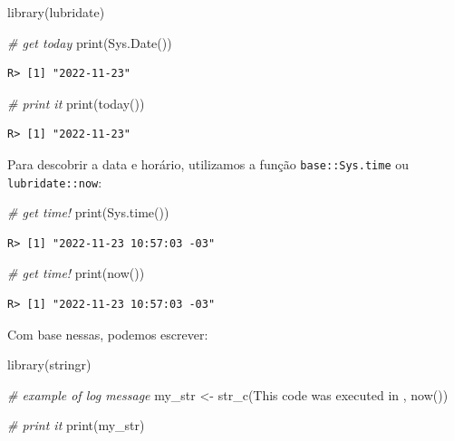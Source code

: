 \documentclass[
  11pt,
]{book}
\newenvironment{Shaded}{\begin{snugshade}}{\end{snugshade}}
\newcommand{\CommentTok}[1]{\textcolor[rgb]{0.37,0.37,0.37}{\textit{#1}}}
\newcommand{\FunctionTok}[1]{\textcolor[rgb]{0,0,0}{#1}}
\newcommand{\NormalTok}[1]{#1}
\newcommand{\OtherTok}[1]{\textcolor[rgb]{0.37,0.37,0.37}{#1}}
\newcommand{\StringTok}[1]{\textcolor[rgb]{0.5,0.5,0.5}{#1}}
\begin{document}
\begin{Shaded}
\begin{Highlighting}[]
\FunctionTok{library}\NormalTok{(lubridate)}

\CommentTok{\# get today}
\FunctionTok{print}\NormalTok{(}\FunctionTok{Sys.Date}\NormalTok{())}
\end{Highlighting}
\end{Shaded}

\begin{verbatim}
R> [1] "2022-11-23"
\end{verbatim}

\begin{Shaded}
\begin{Highlighting}[]
\CommentTok{\# print it}
\FunctionTok{print}\NormalTok{(}\FunctionTok{today}\NormalTok{())}
\end{Highlighting}
\end{Shaded}

\begin{verbatim}
R> [1] "2022-11-23"
\end{verbatim}

Para descobrir a data e horário, utilizamos a função \texttt{base::Sys.time} ou \texttt{lubridate::now}:  

\begin{Shaded}
\begin{Highlighting}[]
\CommentTok{\# get time!}
\FunctionTok{print}\NormalTok{(}\FunctionTok{Sys.time}\NormalTok{())}
\end{Highlighting}
\end{Shaded}

\begin{verbatim}
R> [1] "2022-11-23 10:57:03 -03"
\end{verbatim}

\begin{Shaded}
\begin{Highlighting}[]
\CommentTok{\# get time!}
\FunctionTok{print}\NormalTok{(}\FunctionTok{now}\NormalTok{())}
\end{Highlighting}
\end{Shaded}

\begin{verbatim}
R> [1] "2022-11-23 10:57:03 -03"
\end{verbatim}

Com base nessas, podemos escrever:

\begin{Shaded}
\begin{Highlighting}[]
\FunctionTok{library}\NormalTok{(stringr)}

\CommentTok{\# example of log message}
\NormalTok{my\_str }\OtherTok{\textless{}{-}} \FunctionTok{str\_c}\NormalTok{(}\StringTok{\textquotesingle{}This code was executed in \textquotesingle{}}\NormalTok{, }\FunctionTok{now}\NormalTok{())}

\CommentTok{\# print it}
\FunctionTok{print}\NormalTok{(my\_str)}
\end{Highlighting}
\end{Shaded}
\end{document}

